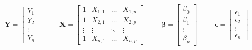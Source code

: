 \begin{equation*}
    \textbf{Y} = \begin{bmatrix}
                    Y_1 \\
                    Y_2 \\
                    \vdots \\
                    Y_n
                 \end{bmatrix}
    \>\>\>\>\>\>\>\>\>\>\> 
    \textbf{X} = \begin{bmatrix}
                    1 & X_{1, 1} & \ldots & X_{1, p} \\
                    1 & X_{2, 1} & \ldots & X_{2, p} \\
                    \vdots & \vdots & \ddots & \vdots \\
                    1 & X_{n, 1} & \ldots & X_{n, p}
                 \end{bmatrix}
    \>\>\>\>\>\>\>\>\>\>\>
    \bm{\beta} = \begin{bmatrix}
                            \beta_0 \\
                            \beta_1 \\
                            \vdots \\
                            \beta_p
                       \end{bmatrix}
    \>\>\>\>\>\>\>\>\>\>\>
    \bm{\epsilon} = \begin{bmatrix}
                            \epsilon_1 \\
                            \epsilon_2 \\
                            \vdots \\
                            \epsilon_n
                       \end{bmatrix}
\end{equation*}

